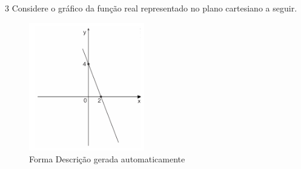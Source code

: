 \begin{escolha}
\begin{boxmedio}
\begin{boxmedio}
{\begin{boxpeq}
\begin{boxpeq}
{\begin{boxpeq}
\begin{boxmedio}
\begin{boxmedio}
\begin{boxpeq}
\begin{boxmedio}
\begin{boxpeq}
\begin{boxpeq}
\begin{boxpeq}
\begin{boxpeq}
\begin{boxmedio}
{\begin{boxmedio}
\begin{boxmedio}
\begin{boxpeq}
\begin{boxmedio}
\begin{boxpeq}
\begin{boxpeq}
\begin{boxpeq}
\begin{escolha}
{\begin{boxmedio}
\begin{boxpeq}
\begin{boxpeq}
\begin{boxpeq}
\begin{boxpeq}
\begin{boxpeq}
\begin{boxmedio}
\begin{boxpeq}
\begin{boxpeq}
\begin{boxpeq}
{\begin{boxpeq}
\begin{boxmedio}
\begin{boxpeq}
\begin{boxpeq}
\begin{boxpeq}
{\begin{boxpeq}
\begin{boxmedio}
{\begin{boxpeq}
\begin{boxpeq}


\num{3} Considere o gráfico da função real representado no plano cartesiano a
seguir.

\begin{figure}
\centering
\includegraphics[width=1.97543in,height=2.20513in]{./_SAEB_9_MAT/media/image137.png}
\caption{Forma Descrição gerada automaticamente}
\end{figure}


\end{boxpeq}
\end{boxpeq}}
\end{boxmedio}
\end{boxpeq}}
\end{boxpeq}
\end{boxpeq}
\end{boxpeq}
\end{boxmedio}
\end{boxpeq}}
\end{boxpeq}
\end{boxpeq}
\end{boxpeq}
\end{boxmedio}
\end{boxpeq}
\end{boxpeq}
\end{boxpeq}
\end{boxpeq}
\end{boxpeq}
\end{boxmedio}}
\end{escolha}
\end{boxpeq}
\end{boxpeq}
\end{boxpeq}
\end{boxmedio}
\end{boxpeq}
\end{boxmedio}
\end{boxmedio}}
\end{boxmedio}
\end{boxpeq}
\end{boxpeq}
\end{boxpeq}
\end{boxpeq}
\end{boxmedio}
\end{boxpeq}
\end{boxmedio}
\end{boxmedio}
\end{boxpeq}}
\end{boxpeq}
\end{boxpeq}}
\end{boxmedio}
\end{boxmedio}
\end{escolha}
